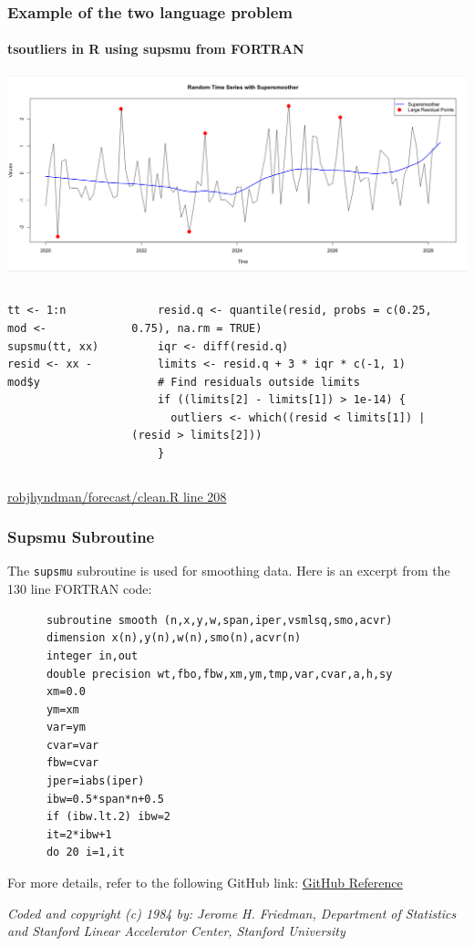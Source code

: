 \documentclass[aspectratio=169]{beamer} %
\begin{document}
\begin{frame}[fragile]
  \frametitle{Example of the two language problem}
  \framesubtitle{tsoutliers in R using supsmu from FORTRAN} 
  \begin{center}
    \includegraphics[width=0.7\linewidth]{time_series.png}
  \end{center}

  \begin{columns}


    \scriptsize
    \begin{verbatim}
tt <- 1:n
mod <- supsmu(tt, xx)
resid <- xx - mod$y
    \end{verbatim}
    \normalsize


    \scriptsize
    \begin{verbatim}
    resid.q <- quantile(resid, probs = c(0.25, 0.75), na.rm = TRUE)
    iqr <- diff(resid.q)
    limits <- resid.q + 3 * iqr * c(-1, 1)
    # Find residuals outside limits
    if ((limits[2] - limits[1]) > 1e-14) {
      outliers <- which((resid < limits[1]) | (resid > limits[2]))
    } 
    \end{verbatim}
    \normalsize
  \end{columns}

  \vfill
  \footnotesize
  \href{https://github.com/robjhyndman/forecast/blob/0583d2fef45336ee59ef486e24b356520350da9a/R/clean.R#L208}{robjhyndman/forecast/clean.R line 208}
\end{frame}
\begin{frame}[fragile]
  \frametitle{Supsmu Subroutine}
  The \verb|supsmu| subroutine is used for smoothing data. Here is an excerpt from the 130 line FORTRAN code:

  \scriptsize
  \begin{verbatim}
      subroutine smooth (n,x,y,w,span,iper,vsmlsq,smo,acvr)
      dimension x(n),y(n),w(n),smo(n),acvr(n)
      integer in,out
      double precision wt,fbo,fbw,xm,ym,tmp,var,cvar,a,h,sy
      xm=0.0
      ym=xm
      var=ym
      cvar=var
      fbw=cvar
      jper=iabs(iper)
      ibw=0.5*span*n+0.5
      if (ibw.lt.2) ibw=2
      it=2*ibw+1
      do 20 i=1,it
  \end{verbatim}
  \normalsize

  \vfill
  \footnotesize
  For more details, refer to the following GitHub link: \href{https://github.com/jakevdp/supsmu/blob/master/supsmu/_supsmu.f}{GitHub Reference}

  \vfill
  \footnotesize
  \textit{Coded and copyright (c) 1984 by: Jerome H. Friedman, Department of Statistics and Stanford Linear Accelerator Center, Stanford University}
\end{frame}
\end{document}
